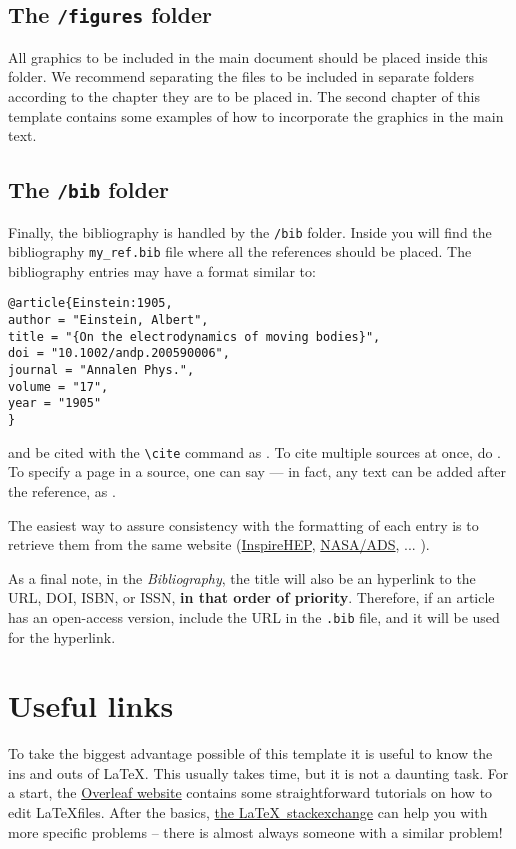 \subsection{The {\normalfont\texttt{/figures}} folder} %
%
All graphics to be included in the main document should be placed inside this folder. We recommend separating the files to be included in separate folders according to the chapter they are to be placed in. The second chapter of this template contains some examples of how to incorporate the graphics in the main text.

\subsection{The {\normalfont\texttt{/bib}} folder} %

Finally, the bibliography is handled by the \texttt{/bib} folder. Inside you will find the bibliography \texttt{my\_ref.bib} file where all the references should be placed. The bibliography entries may have a format similar to:

\begin{verbatim}
@article{Einstein:1905,
author = "Einstein, Albert",
title = "{On the electrodynamics of moving bodies}",
doi = "10.1002/andp.200590006",
journal = "Annalen Phys.",
volume = "17",
year = "1905"
}
\end{verbatim}
%
and be cited with the \verb|\cite| command as \cite{Einstein:1905}. To cite multiple sources at once, do \cite{FeynCalc:1991,FeynCalc:2016,FeynCalc:2020}. To specify a page in a source, one can say \cite[p.~500]{Dokshitzer:1991} --- in fact, any text can be added after the reference, as \cite[Any text you might want]{Peskin:1995}.

The easiest way to assure consistency with the formatting of each entry is to retrieve them from the same website (\href{https://inspirehep.net/}{InspireHEP}, \href{https://ui.adsabs.harvard.edu/}{NASA/ADS}, ... ).

As a final note, in the \textit{Bibliography}, the title will also be an hyperlink to the URL, DOI, ISBN, or ISSN, \textbf{in that order of priority}. Therefore, if an article has an open-access version, include the URL in the \texttt{.bib} file, and it will be used for the hyperlink.

\section{Useful links}
%
To take the biggest advantage possible of this template it is useful to know the ins and outs of \LaTeX. This usually takes time, but it is not a daunting task. For a start, the \href{https://www.overleaf.com/learn}{Overleaf website} contains some straightforward tutorials on how to edit \LaTeX files. After the basics, \href{https://tex.stackexchange.com}{the \LaTeX\, stackexchange} can help you with more specific problems -- there is almost always someone with a similar problem!

